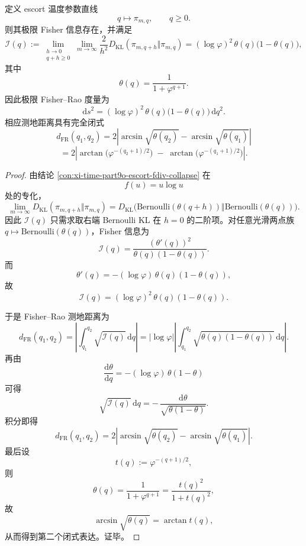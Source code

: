 \begin{conclusion}\label{con:xi-time-part9o-escort-fisher-rao-closed}
定义 escort 温度参数直线
\[
q\longmapsto \pi_{m,q},
\qquad q\ge 0.
\]
则其极限 Fisher 信息存在，并满足
\[
\mathcal I(q)
:=
\lim_{\substack{h\to 0\\ q+h\ge 0}}\lim_{m\to\infty}\frac{2}{h^2}
D_{\mathrm{KL}}(\pi_{m,q+h}\Vert \pi_{m,q})
=
(\log\varphi)^2\,\theta(q)\bigl(1-\theta(q)\bigr),
\]
其中
\[
\theta(q)=\frac{1}{1+\varphi^{q+1}}.
\]
因此极限 Fisher--Rao 度量为
\[
\mathrm ds^2
=
(\log\varphi)^2\,\theta(q)\bigl(1-\theta(q)\bigr)\,\mathrm dq^2.
\]
相应测地距离具有完全闭式
\[
d_{\mathrm{FR}}(q_1,q_2)
=
2\left|
\arcsin\sqrt{\theta(q_2)}-\arcsin\sqrt{\theta(q_1)}
\right|
\]
\[
=
2\left|
\arctan\!\bigl(\varphi^{-(q_2+1)/2}\bigr)
\;-\;
\arctan\!\bigl(\varphi^{-(q_1+1)/2}\bigr)
\right|.
\]
\end{conclusion}
\begin{proof}
由结论 \ref{con:xi-time-part9o-escort-fdiv-collapse} 在
\[
f(u)=u\log u
\]
处的专化，
\[
\lim_{m\to\infty}D_{\mathrm{KL}}(\pi_{m,q+h}\Vert \pi_{m,q})
=
D_{\mathrm{KL}}\!\bigl(\mathrm{Bernoulli}(\theta(q+h))\Vert \mathrm{Bernoulli}(\theta(q))\bigr).
\]
因此 \(\mathcal I(q)\) 只需求取右端 Bernoulli KL 在 \(h=0\) 的二阶项。对任意光滑两点族 \(q\mapsto \mathrm{Bernoulli}(\theta(q))\)，Fisher 信息为
\[
\mathcal I(q)=\frac{(\theta'(q))^2}{\theta(q)(1-\theta(q))}.
\]
而
\[
\theta'(q)=-(\log\varphi)\,\theta(q)(1-\theta(q)),
\]
故
\[
\mathcal I(q)=
(\log\varphi)^2\,\theta(q)(1-\theta(q)).
\]

于是 Fisher--Rao 测地距离为
\[
d_{\mathrm{FR}}(q_1,q_2)
=
\left|
\int_{q_1}^{q_2}\sqrt{\mathcal I(q)}\,\mathrm dq
\right|
=
|\log\varphi|
\left|
\int_{q_1}^{q_2}\sqrt{\theta(q)(1-\theta(q))}\,\mathrm dq
\right|.
\]
再由
\[
\frac{\mathrm d\theta}{\mathrm dq}
=
-(\log\varphi)\,\theta(1-\theta)
\]
可得
\[
\sqrt{\mathcal I(q)}\,\mathrm dq
=
-\,\frac{\mathrm d\theta}{\sqrt{\theta(1-\theta)}}.
\]
积分即得
\[
d_{\mathrm{FR}}(q_1,q_2)
=
2\left|
\arcsin\sqrt{\theta(q_2)}-\arcsin\sqrt{\theta(q_1)}
\right|.
\]
最后设
\[
t(q):=\varphi^{-(q+1)/2},
\]
则
\[
\theta(q)=\frac{1}{1+\varphi^{q+1}}=\frac{t(q)^2}{1+t(q)^2},
\]
故
\[
\arcsin\sqrt{\theta(q)}=\arctan t(q),
\]
从而得到第二个闭式表达。证毕。
\end{proof}




